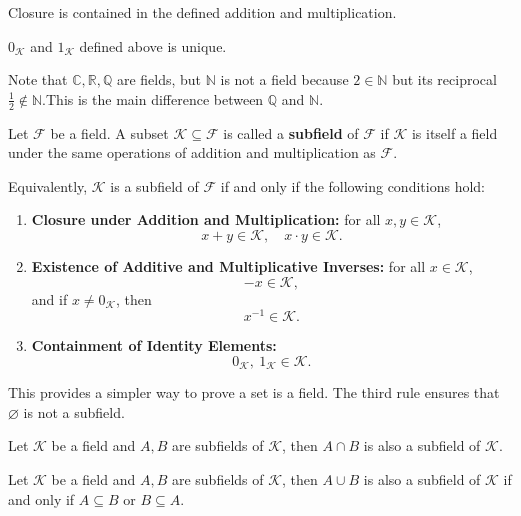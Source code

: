 \documentclass{ctexart}
\begin{document}
	\begin{myrmk}
		Closure is contained in the defined addition and multiplication.
	\end{myrmk}
	\begin{mythm}
		$0_\mathcal{K}$ and $1_\mathcal{K}$ defined above is unique.
	\end{mythm}
	\begin{myex}
		Note that $\mathbb{C,R,Q}$ are fields, but $\mathbb{N}$ is not a field because $2 \in \mathbb{N}$ but its reciprocal $\frac{1}{2} \notin \mathbb{N}$.This is the main difference between $\mathbb{Q}$ and $\mathbb{N}$.
	\end{myex}
	\begin{mydef}
		Let $\mathcal{F}$ be a field. A subset $\mathcal{K} \subseteq \mathcal{F}$ is called a \textbf{subfield} of $\mathcal{F}$ if $\mathcal{K}$ is itself a field under the same operations of addition and multiplication as $\mathcal{F}$.
		
		Equivalently, $\mathcal{K}$ is a subfield of $\mathcal{F}$ if and only if the following conditions hold:
		\begin{enumerate}
			\item \textbf{Closure under Addition and Multiplication:}  
			for all $x, y \in \mathcal{K}$,
			\[
			x + y \in \mathcal{K}, \quad x \cdot y \in \mathcal{K}.
			\]
			
			\item \textbf{Existence of Additive and Multiplicative Inverses:}  
			for all $x \in \mathcal{K}$,
			\[
			-x \in \mathcal{K}, 
			\]
			and if $x \neq 0_{\mathcal{K}}$, then 
			\[
			x^{-1} \in \mathcal{K}.
			\]
			
			\item \textbf{Containment of Identity Elements:}  
			\[
			0_{\mathcal{K}},\ 1_{\mathcal{K}} \in \mathcal{K}.
			\]
		\end{enumerate}
	\end{mydef}
	\begin{myrmk}
		This provides a simpler way to prove a set is a field. The third rule ensures that $\varnothing$ is not a subfield.
	\end{myrmk}
	\begin{mypro}
		Let $\mathcal{K}$ be a field and $A,B$ are subfields of $\mathcal{K}$, then $A \cap B$ is also a subfield of $\mathcal{K}$.
	\end{mypro}
	\begin{mypro}
		Let $\mathcal{K}$ be a field and $A,B$ are subfields of $\mathcal{K}$, then $A \cup B$ is also a subfield of $\mathcal{K}$ if and only if $A \subseteq B$ or $B \subseteq A$.
	\end{mypro}
\end{document}
